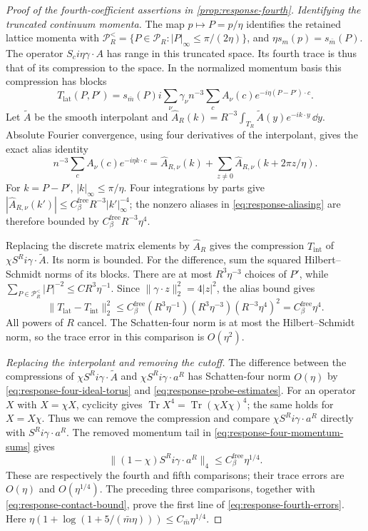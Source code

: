 \begin{proof}[Proof of the fourth-coefficient assertions in \cref{prop:response-fourth}]
\emph{Identifying the truncated continuum momenta.}
The map $p\mapsto P=p/\eta$ identifies the retained
lattice momenta with
$\mathcal P_R^<=\{P\in\mathcal P_R:|P|_\infty\le\pi/(2\eta)\}$,
and $\eta s_m(p)=s_{\bar m}(P)$. The operator
$S_ci\eta\gamma\cdot A$ has range in this truncated
space. Its fourth trace is thus that of its compression
to the space. In the normalized momentum basis this
compression has blocks
\[
 T_{\mathrm{lat}}(P,P')=s_{\bar m}(P)i\sum_\nu\gamma_\nu
                 n^{-3}\sum_cA_\nu(c)e^{-i\eta(P-P')\cdot c}.
\]
Let $\widetilde A$ be the smooth interpolant and
$\widehat A_R(k)=R^{-3}\int_{T_R}\widetilde A(y)e^{-ik\cdot y}\,\dd y$.
Absolute Fourier convergence, using four derivatives
of the interpolant, gives the exact alias identity
\begin{equation}\label{eq:response-aliasing}
 n^{-3}\sum_cA_\nu(c)e^{-i\eta k\cdot c}
    =\widehat A_{R,\nu}(k)+
          \sum_{z\ne0}\widehat A_{R,\nu}(k+2\pi z/\eta).
\end{equation}
For $k=P-P'$, $|k|_\infty\le\pi/\eta$. Four integrations
by parts give
$|\widehat A_{R,\nu}(k')|\le C_\beta^{\mathrm{free}} R^{-3}|k'|_\infty^{-4}$;
the nonzero aliases in \eqref{eq:response-aliasing} are
therefore bounded by $C_\beta^{\mathrm{free}} R^{-3}\eta^4$.

Replacing the discrete matrix elements by $\widehat A_R$
gives the compression $T_{\mathrm{int}}$ of
$\chi S^Ri\gamma\cdot\widetilde A$. Its norm is bounded.
For the difference, sum the squared Hilbert--Schmidt
norms of its blocks. There are at most $R^3\eta^{-3}$
choices of $P'$, while
$\sum_{P\in\mathcal P_R^<}|P|^{-2}\le CR^3\eta^{-1}$.
Since $\|\gamma\cdot z\|_2^2=4|z|^2$, the alias bound
gives
\[
 \|T_{\mathrm{lat}}-T_{\mathrm{int}}\|_2^2
     \le C_\beta^{\mathrm{free}}(R^3\eta^{-1})(R^3\eta^{-3})
                                     (R^{-3}\eta^4)^2
     =C_\beta^{\mathrm{free}}\eta^4.
\]
All powers of $R$ cancel. The Schatten-four norm is
at most the Hilbert--Schmidt norm, so the trace error
in this comparison is $O(\eta^2)$.

\emph{Replacing the interpolant and removing the cutoff.}
The difference between the compressions of
$\chi S^Ri\gamma\cdot\widetilde A$ and
$\chi S^Ri\gamma\cdot a^R$ has Schatten-four norm
$O(\eta)$ by \eqref{eq:response-four-ideal-torus} and
\eqref{eq:response-probe-estimates}. For an operator
$X$ with $X=\chi X$, cyclicity gives
$\operatorname{Tr}X^4=\operatorname{Tr}(\chi X\chi)^4$;
the same holds for $X=X\chi$. Thus we can remove the
compression and compare $\chi S^Ri\gamma\cdot a^R$
directly with $S^Ri\gamma\cdot a^R$. The removed momentum
tail in \eqref{eq:response-four-momentum-sums} gives
\[
 \|(1-\chi)S^Ri\gamma\cdot a^R\|_4\le C_\beta^{\mathrm{free}}\eta^{1/4}.
\]
These are respectively the fourth and fifth comparisons;
their trace errors are $O(\eta)$ and $O(\eta^{1/4})$.
The preceding three comparisons, together with
\eqref{eq:response-contact-bound}, prove the first line
of \eqref{eq:response-fourth-errors}. Here
$\eta(1+\log(1+5/(\bar m\eta)))\le C_{\bar m}\eta^{1/4}$.


\end{proof}
